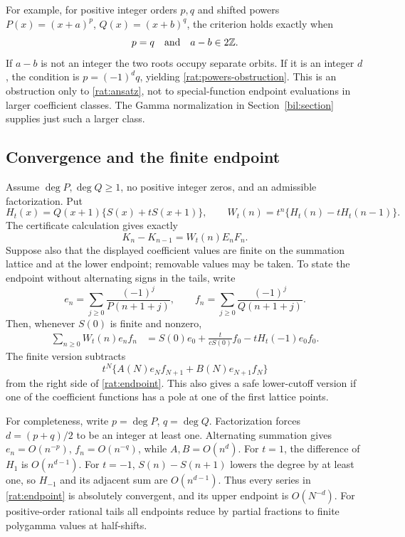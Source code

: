 For example, for positive integer orders $p,q$ and shifted powers
$P(x)=(x+a)^p$, $Q(x)=(x+b)^q$, the criterion holds exactly when
\begin{equation}\label{rat:powers-obstruction}
 p=q\quad\hbox{and}\quad a-b\in2\mathbb Z.
\end{equation}
If $a-b$ is not an integer the two roots occupy separate orbits.
If it is an integer $d$, the condition is $p=(-1)^dq$, yielding
\eqref{rat:powers-obstruction}. This is an obstruction only to
\eqref{rat:ansatz}, not to special-function endpoint evaluations in
larger coefficient classes. The Gamma normalization in
Section~\ref{bil:section} supplies just such a larger class.

\subsection{Convergence and the finite endpoint}

Assume $\deg P,\deg Q\ge1$, no positive integer zeros, and an
admissible factorization. Put
\[
 H_t(x)=Q(x+1)\{S(x)+tS(x+1)\},\qquad
 W_t(n)=t^n\{H_t(n)-tH_t(n-1)\}.
\]
The certificate calculation gives exactly
\begin{equation}\label{rat:finite-difference}
 K_n-K_{n-1}=W_t(n)E_nF_n.
\end{equation}
Suppose also that the displayed coefficient values are finite on the
summation lattice and at the lower endpoint; removable values may be
taken. To state the endpoint without alternating signs in the tails,
write
\[
 e_n=\sum_{j\ge0}\frac{(-1)^j}{P(n+1+j)},\qquad
 f_n=\sum_{j\ge0}\frac{(-1)^j}{Q(n+1+j)}.
\]
Then, whenever $S(0)$ is finite and nonzero,
\begin{align}
 \sum_{n\ge0}W_t(n)e_nf_n
 &=S(0)e_0+\frac{t}{cS(0)}f_0
       -tH_t(-1)e_0f_0.\label{rat:endpoint}
\end{align}
The finite version subtracts
\[
 t^N\{A(N)e_Nf_{N+1}+B(N)e_{N+1}f_N\}
\]
from the right side of \eqref{rat:endpoint}. This also gives a
safe lower-cutoff version if one of the coefficient functions has a
pole at one of the first lattice points.

For completeness, write $p=\deg P$, $q=\deg Q$. Factorization forces
$d=(p+q)/2$ to be an integer at least one. Alternating summation
gives $e_n=O(n^{-p})$, $f_n=O(n^{-q})$, while $A,B=O(n^d)$.
For $t=1$, the difference of $H_1$ is $O(n^{d-1})$. For $t=-1$,
$S(n)-S(n+1)$ lowers the degree by at least one, so $H_{-1}$ and
its adjacent sum are $O(n^{d-1})$. Thus every series in
\eqref{rat:endpoint} is absolutely convergent, and its upper endpoint
is $O(N^{-d})$. For positive-order rational tails all endpoints
reduce by partial fractions to finite polygamma values at half-shifts.

